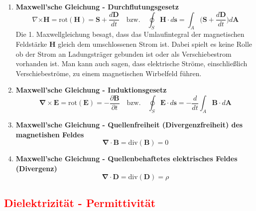 				\begin{enumerate}
					\item \textbf{Maxwell'sche Gleichung - Durchflutungsgesetz}
					\begin{equation}
						\nabla \bm{\times} \bm{H} = \text{rot} (\bm{H}) = \bm{S} +  \frac{d\bm{D}}{dt}  \quad	\text{bzw.}	 \quad \oint_{S} \bm{H}\cdot d\bm{s} = \int_{A}\bigg(\bm{S} + \frac{d\bm{D}}{dt}\bigg) d\bm{A}
					\end{equation}	
					Die 1. Maxwellgleichung besagt, dass das Umlaufintegral der magnetischen Feldstärke $ \bm{H} $ gleich dem umschlossenen Strom ist. Dabei spielt es keine Rolle ob der Strom an Ladungsträger gebunden ist oder als Verschiebestrom vorhanden ist. Man kann auch sagen, dass elektrische Ströme, einschließlich Verschiebeströme, zu einem magnetischen Wirbelfeld führen.
					
					\item \textbf{Maxwell'sche Gleichung - Induktionsgesetz}
					\begin{equation}
						\bm{\nabla} \times \bm{E} = \text{rot} (\bm{E}) = -\frac{\partial \bm{B}}{\partial t}\quad 	\text{bzw.}	 \quad \oint_{S} \bm{E}\cdot  d\bm{s} = -\frac{d}{dt} \int_{A} \bm{B}\cdot d\bm{A}
					\end{equation}
					
					\item \textbf{Maxwell'sche Gleichung - Quellenfreiheit (Divergenzfreiheit) des magnetishen Feldes}
					\begin{equation}
						\bm{\nabla} \cdot \bm{B}= \text{div}(\bm{B}) = 0
					\end{equation}
					
					\item \textbf{Maxwell'sche Gleichung - Quellenbehaftetes elektrisches Feldes (Divergenz)}
					\begin{equation}
						\bm{\nabla}\cdot \bm{D} = \text{div}(\bm{D}) = \rho
					\end{equation}
				\end{enumerate}
		
		
		\subsection{\textcolor{red}{Dielektrizität - Permittivität}}

